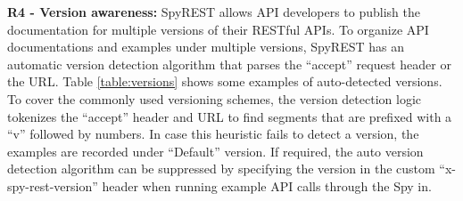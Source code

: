 \documentclass[conference]{IEEEtran}
\begin{document}
\textbf{R4 - Version awareness:} SpyREST allows API developers to publish the documentation for multiple versions of their RESTful APIs. To organize API documentations and examples under multiple versions, SpyREST has an automatic version detection algorithm that parses the ``accept'' request header or the URL. Table \ref{table:versions} shows some examples of auto-detected versions. To cover the commonly used versioning schemes, the version detection logic tokenizes the ``accept'' header and URL to find segments that are prefixed with a ``v'' followed by numbers. In case this heuristic fails to detect a version, the examples are recorded under ``Default'' version. If required, the auto version detection algorithm can be suppressed by specifying the version in the custom ``x-spy-rest-version'' header when running example API calls through the Spy in.
\end{document}
